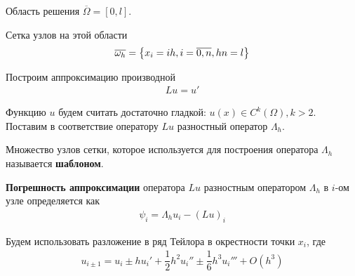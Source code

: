 %

Область решения $\overline{\Omega} = [0, l]$.

Сетка узлов на этой области
\begin{align*}
  \overline{\omega_h} = \left\{ x_i = ih, i = \overline{0, n}, hn = l \right\}
\end{align*}

Построим аппроксимацию производной
\begin{align*}
  Lu = u'
\end{align*}

Функцию $u$ будем считать достаточно гладкой: $u(x) \in C^k(\Omega), k > 2$. Поставим
в соответствие оператору $Lu$ разностный оператор $\Lambda_h$.

\begin{definition}
  Множество узлов сетки, которое используется для построения оператора $\Lambda_h$
  называется \textbf{шаблоном}.
\end{definition}

\textbf{Погрешность аппроксимации} оператора $Lu$ разностным оператором $\Lambda_h$
в $i$-ом узле определяется как
\begin{align*}
  \psi_i = \Lambda_hu_i - (Lu)_i
\end{align*}

Будем использовать разложение в ряд Тейлора в окрестности точки $x_i$, где
\begin{align*}
  u_{i\pm 1} = u_i \pm hu_i' + \dfrac{1}{2}h^2u_i'' \pm \dfrac{1}{6}h^3u_i''' + O(h^3)
\end{align*}

